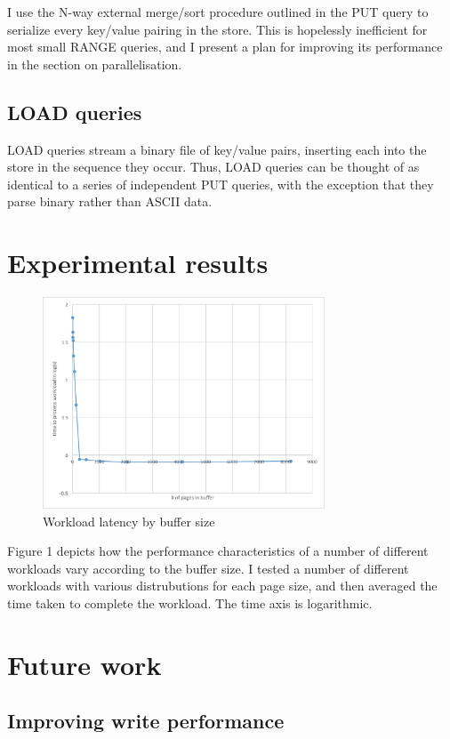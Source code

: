 \documentclass{acm}
\begin{document}
I use the N-way external merge/sort procedure outlined in the PUT query to serialize every key/value pairing in the store. This is hopelessly inefficient for most small RANGE queries, and I present a plan for improving its performance in the section on parallelisation.

\subsection{LOAD queries}

LOAD queries stream a binary file of key/value pairs, inserting each into the store in the sequence they occur. Thus, LOAD queries can be thought of as identical to a series of independent PUT queries, with the exception that they parse binary rather than ASCII data.

\section{Experimental results}

\begin{figure}
\includegraphics[width=3.3in]{chart}
\caption{Workload latency by buffer size}
\end{figure}

Figure 1 depicts how the performance characteristics of a number of different workloads vary according to the buffer size. I tested a number of different workloads with various distrubutions for each page size, and then averaged the time taken to complete the workload. The time axis is logarithmic.

\section{Future work}

\subsection{Improving write performance}
\end{document}
